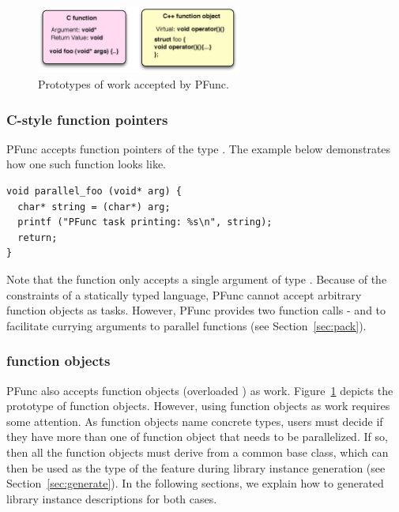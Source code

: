 \begin{figure}
\centering
\includegraphics[width=0.6\textwidth]{figs/functors}
\caption{Prototypes of work accepted by PFunc.}
\label{fig:functors}
\end{figure}

\subsubsection{C-style function pointers}
PFunc accepts function pointers of the type . The
example below demonstrates how one such function looks like.

\begin{lstlisting}
void parallel_foo (void* arg) {
  char* string = (char*) arg;
  printf ("PFunc task printing: %s\n", string);
  return;
}
\end{lstlisting}

Note that the function only accepts a single argument of type .
Because of the constraints of a statically typed language, PFunc cannot accept
arbitrary function objects as tasks.  However, PFunc provides two function
calls -  and  to facilitate currying
arguments to parallel functions (see Section~\ref{sec:pack}).

\subsubsection{\Cpp{} function objects}
PFunc also accepts \Cpp{} function objects (overloaded ) as
work. Figure~\ref{fig:functors} depicts the prototype of function objects.
However, using function objects as work requires some attention. As function
objects name concrete types, users must decide if they have more than one
 of function object that needs to be parallelized. If so, then 
all the function objects must derive from a common base class, which can then
be used as the type of the  feature during library 
instance generation (see Section~\ref{sec:generate}). In the following 
sections, we explain how to generated library instance descriptions for both 
cases.

